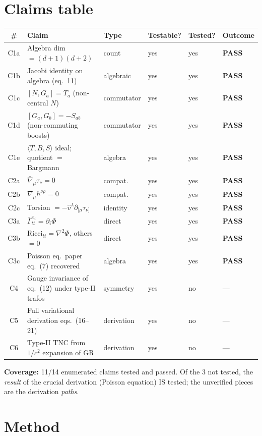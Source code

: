 \documentclass[11pt]{article}
\begin{document}
\section{Claims table}
\begin{longtable}{@{}clllll@{}}
\toprule
\# & Claim & Type & Testable? & Tested? & Outcome \\
\midrule
C1a & Algebra dim $=(d+1)(d+2)$                          & count      & yes & yes & {\bf PASS} \\
C1b & Jacobi identity on algebra (eq.~11)                & algebraic  & yes & yes & {\bf PASS} \\
C1c & $[N,G_a]=T_a$ (non-central $N$)                    & commutator & yes & yes & {\bf PASS} \\
C1d & $[G_a,G_b]=-S_{ab}$ (non-commuting boosts)         & commutator & yes & yes & {\bf PASS} \\
C1e & $\langle T,B,S\rangle$ ideal; quotient $=$ Bargmann& algebra    & yes & yes & {\bf PASS} \\
C2a & $\bar\nabla_\mu\tau_\nu=0$                         & compat.    & yes & yes & {\bf PASS} \\
C2b & $\bar\nabla_\mu h^{\nu\rho}=0$                     & compat.    & yes & yes & {\bf PASS} \\
C2c & Torsion $=-\hat v^\lambda \partial_{[\mu}\tau_{\nu]}$ & identity& yes & yes & {\bf PASS} \\
C3a & $\bar\Gamma^{x_i}_{tt}=\partial_i\Phi$              & direct     & yes & yes & {\bf PASS} \\
C3b & $\mathrm{Ricci}_{tt}=\nabla^2\Phi$, others $=0$    & direct     & yes & yes & {\bf PASS} \\
C3c & Poisson eq.\ paper eq.~(7) recovered               & algebra    & yes & yes & {\bf PASS} \\
C4  & Gauge invariance of eq.~(12) under type-II trafos  & symmetry   & yes & no  & --- \\
C5  & Full variational derivation eqs.~(16--21)          & derivation & yes & no  & --- \\
C6  & Type-II TNC from $1/c^2$ expansion of GR           & derivation & yes & no  & --- \\
\bottomrule
\end{longtable}
{\bf Coverage:} 11/14 enumerated claims tested and passed. Of the 3 not tested,
the \emph{result} of the crucial derivation (Poisson equation) IS tested;
the unverified pieces are the derivation \emph{paths}.

\section{Method}
\end{document}
